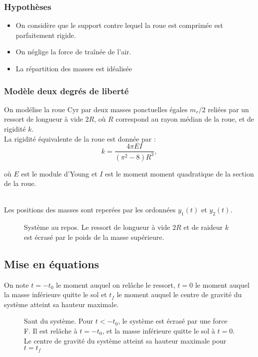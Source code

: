 \subsubsection{Hypothèses}
\begin{itemize}
    \item On considère que le support contre lequel la roue est comprimée est parfaitement rigide.
    \item On néglige la force de traînée de l'air.
    \item La répartition des masses est idéalisée
\end{itemize}

\subsubsection{Modèle deux degrés de liberté}
On modélise la roue Cyr par deux masses ponctuelles égales $m_r/2$ reliées par un ressort de longueur à vide $2R$, où $R$ correspond au rayon médian de la roue, et de rigidité $k$. \\
La rigidité équivalente de la roue est donnée par \cite{yangkim}:
\begin{equation}
    k=\frac{4\pi EI}{(\pi^2 -8)R^3},
    \label{eq:0}
\end{equation}

où $E$ est le module d'Young et $I$ est le moment moment quadratique de la section de la roue.

\\
 Les positions des masses sont reperées par les ordonnées $y_1(t)$ et $y_2(t)$.

\begin{figure}[htb]
\centering


\caption{Système au repos. Le ressort de longueur à vide $2R$ et de raideur $k$ est écrasé par le poids de la masse supérieure.}
\label{fig:repos}
\end{figure}

\subsection{Mise en équations}

On note $t=-t_0$ le moment auquel on relâche le ressort, $t=0$ le moment auquel la masse inférieure quitte le sol et $t_f$ le moment auquel le centre de gravité du système atteint sa hauteur maximale.
\\

\begin{figure}[h]

\def\svgwidth{400}


\caption{Saut du système. Pour $t<-t_0$, le système est écrasé par une force F. Il est relâche à $t=-t_0$, et la masse inférieure quitte le sol à $t=0$. Le centre de gravité du système atteint sa hauteur maximale pour $t=t_f$}
\label{fig:saut}
\end{figure}

